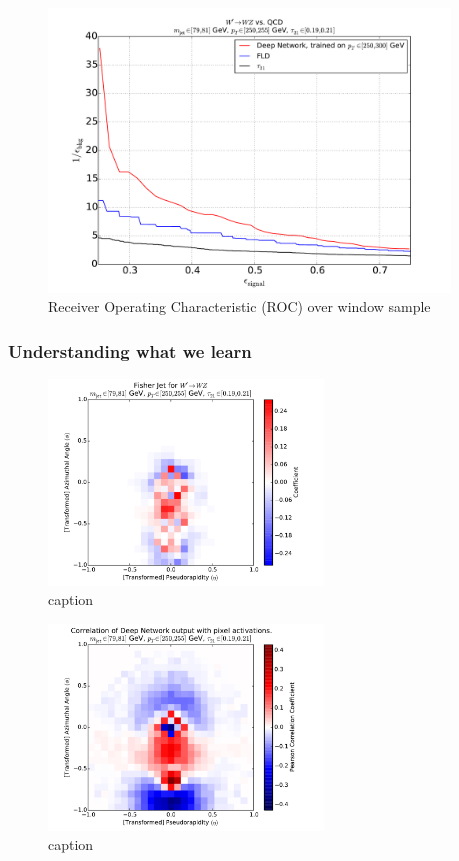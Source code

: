 \documentclass{article}
\begin{document}
\begin{figure}[htbp]
  \centering
  \includegraphics[width=0.95\textwidth]{figures/augwindow-roc.pdf}
  \caption{Receiver Operating Characteristic (ROC) over window sample}
  \label{fig:rocWindow}
\end{figure}

\subsubsection{Understanding what we learn} %
\label{ssub:understanding_what_we_learn}

\begin{figure}[htbp]
  \centering
  \includegraphics[width=0.65\textwidth]{figures/fld-benwindow.pdf}
  \caption{caption}
  \label{fig:fldWindow}
\end{figure}

\begin{figure}[htbp]
  \centering
  \includegraphics[width=0.65\textwidth]{figures/pixel-activations-corr-benwindow.pdf}
  \caption{caption}
  \label{fig:corrWindow}
\end{figure}
\end{document}

